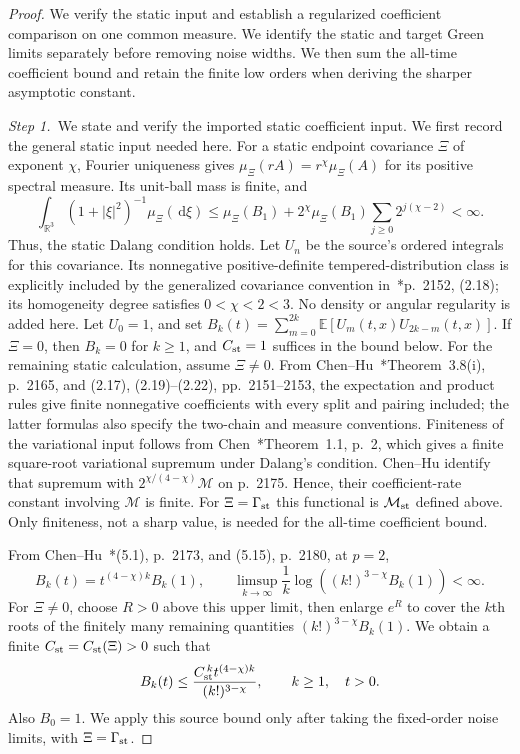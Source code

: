 \documentclass[12pt,oneside,openany]{book}
\numberwithin{equation}{section}
\theoremstyle{nogostyle}
\theoremstyle{definition}
\newcommand{\R}{\mathbb{R}}
\newcommand{\E}{\mathbb{E}}
\newcommand{\ud}{\,\mathrm{d}}
\begin{document}
\begin{proof}
  We verify the static input and establish a regularized coefficient
  comparison on one common measure. We identify the static and target Green
  limits separately before removing noise widths. We then sum the all-time
  coefficient bound and retain the finite low orders when deriving the sharper
  asymptotic constant.


  \medskip
  \noindent\textit{Step 1.~}We state and verify the imported static
  coefficient input.
  We first record the general static input needed here. For a static endpoint
  covariance $\Xi$ of exponent $\chi$, Fourier uniqueness gives $\mu_\Xi(rA) =
  r^\chi\mu_\Xi(A)$ for its positive spectral measure. Its unit-ball mass is
  finite, and
  \[
    \int_{\R^3}(1+|\xi|^2)^{-1}\mu_\Xi(\ud\xi)
    \le\mu_\Xi(B_1)
    +2^\chi\mu_\Xi(B_1)\sum_{j\ge0}2^{j(\chi-2)}<\infty.
  \]
  Thus, the static Dalang condition holds. Let $U_n$ be the source's ordered
  integrals for this covariance. Its nonnegative positive-definite
  tempered-distribution class is explicitly included by the generalized
  covariance convention in~\cite{chen.hu:25:hyperbolic}*{p.~2152, (2.18)}; its
  homogeneity degree satisfies $0 < \chi < 2 < 3$. No density or angular
  regularity is added here. Let $U_0 = 1$, and set $B_k(t) =
  \sum_{m=0}^{2k}\E[U_m(t,x)U_{2k-m}(t,x)]$. If $\Xi = 0$, then $B_k = 0$ for $k
  \ge 1$, and $C_{\rm st} = 1$ suffices in the bound below. For the remaining
  static calculation, assume $\Xi \ne 0$. From
  Chen--Hu~\cite{chen.hu:25:hyperbolic}*{Theorem~3.8(i), p.~2165, and (2.17),
  (2.19)--(2.22), pp.~2151--2153}, the expectation and product rules give finite
  nonnegative coefficients with every split and pairing included; the latter
  formulas also specify the two-chain and measure conventions. Finiteness of the
  variational input follows from Chen~\cite{chen:23:exponential}*{Theorem~1.1,
  p.~2}, which gives a finite square-root variational supremum under Dalang's
  condition. Chen--Hu identify that supremum with $2^{\chi/(4-\chi)}\mathcal{M}$
  on p.~2175. Hence, their coefficient-rate constant involving $\mathcal{M}$ is
  finite. For $\Xi = \Gamma_{\rm st}$ this functional is $\mathcal{M}_{\rm st}$
  defined above. Only finiteness, not a sharp value, is needed for the all-time
  coefficient bound.

  From Chen--Hu~\cite{chen.hu:25:hyperbolic}*{(5.1), p.~2173, and (5.15),
  p.~2180}, at $p = 2$,
  \[
    B_k(t)=t^{(4-\chi)k}B_k(1),\qquad
    \limsup_{k\to\infty}\frac1k
    \log\left((k!)^{3-\chi}B_k(1)\right)<\infty.
  \]
  For $\Xi \ne 0$, choose $R > 0$ above this upper limit, then enlarge $e^R$ to
  cover the $k$th roots of the finitely many remaining quantities
  $(k!)^{3-\chi}B_k(1)$. We obtain a finite $C_{\rm st} = C_{\rm st}(\Xi) > 0$
  such that
  \begin{equation}\label{E:three-static-coefficient}
    B_k(t)\le\frac{C_{\rm st}^{\,k}t^{(4-\chi)k}}{(k!)^{3-\chi}},
    \qquad k\ge1,\quad t>0.
  \end{equation}
  Also $B_0 = 1$. We apply this source bound only after taking the fixed-order
  noise limits, with $\Xi = \Gamma_{\rm st}$.



\end{proof}
\end{document}
